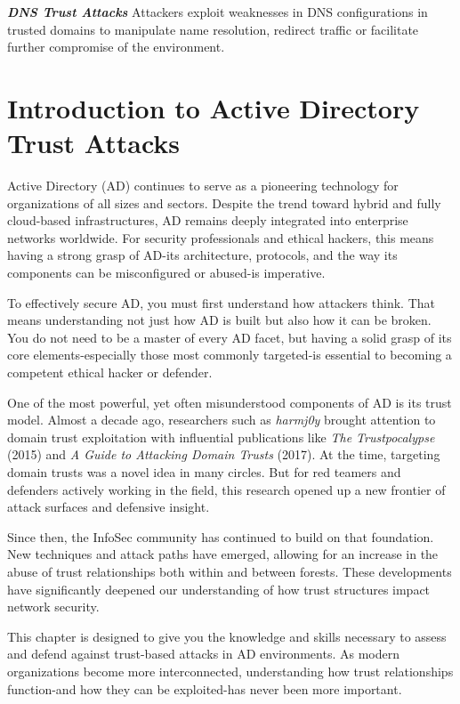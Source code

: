 \textbf{\textit{DNS Trust Attacks}}
Attackers exploit weaknesses in DNS configurations in trusted domains to manipulate name resolution, redirect traffic or facilitate further compromise of the environment.

\section{Introduction to Active Directory Trust Attacks}
Active Directory (AD) continues to serve as a pioneering technology for organizations of all sizes and sectors. Despite the trend toward hybrid and fully cloud-based infrastructures, AD remains deeply integrated into enterprise networks worldwide. For security professionals and ethical hackers, this means having a strong grasp of AD-its architecture, protocols, and the way its components can be misconfigured or abused-is imperative.

To effectively secure AD, you must first understand how attackers think. That means understanding not just how AD is built but also how it can be broken. You do not need to be a master of every AD facet, but having a solid grasp of its core elements-especially those most commonly targeted-is essential to becoming a competent ethical hacker or defender.

One of the most powerful, yet often misunderstood components of AD is its trust model. Almost a decade ago, researchers such as \textit{harmj0y} brought attention to domain trust exploitation with influential publications like \textit{The Trustpocalypse} (2015) and \textit{A Guide to Attacking Domain Trusts} (2017). At the time, targeting domain trusts was a novel idea in many circles. But for red teamers and defenders actively working in the field, this research opened up a new frontier of attack surfaces and defensive insight.

Since then, the InfoSec community has continued to build on that foundation. New techniques and attack paths have emerged, allowing for an increase in the abuse of trust relationships both within and between forests. These developments have significantly deepened our understanding of how trust structures impact network security.

This chapter is designed to give you the knowledge and skills necessary to assess and defend against trust-based attacks in AD environments. As modern organizations become more interconnected, understanding how trust relationships function-and how they can be exploited-has never been more important.

